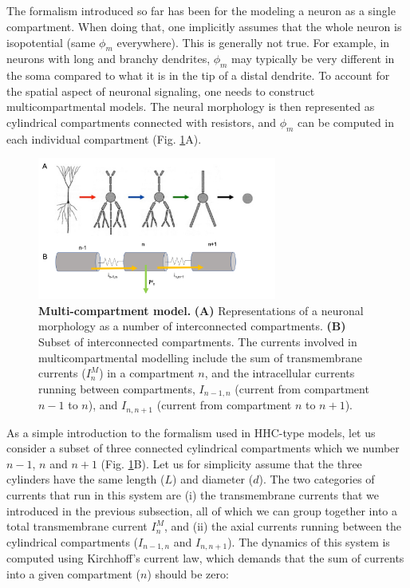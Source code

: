 \subsection{}
\label{sec:Neuron:morphology}
The formalism introduced so far has been for the modeling a neuron as a single compartment. When doing that, one implicitly assumes that the whole neuron is isopotential (same $\phi_m$ everywhere). This is generally not true. For example, in neurons with long and branchy dendrites, $\phi_m$ may typically be very different in the soma compared to what it is in the tip of a distal dendrite. To account for the spatial aspect of neuronal signaling, one needs to construct multicompartmental models. The neural morphology is then represented as cylindrical compartments connected with resistors, and $\phi_m$ can be computed in each individual compartment  (Fig. \ref{Neuron:fig:multikompisen}A). 

\begin{figure}[!ht]
\begin{center}
\includegraphics[width=0.7\textwidth]{Figures/Neuron/Multikompis.png}
\end{center}
\caption{\textbf{Multi-compartment model.} {\bf (A)} Representations of a neuronal morphology as a number of interconnected compartments. {\bf (B)} Subset of interconnected compartments. The currents involved in multicompartmental modelling include the sum of transmembrane currents ($I^M_n$) in a compartment $n$, and the intracellular currents running between 
compartments, $I_{n-1,n}$ (current from compartment $n-1$ to $n$), and $I_{n,n+1}$ (current from compartment $n$ to $n+1$).}
\label{Neuron:fig:multikompisen}
\end{figure}

As a simple introduction to the formalism used in HHC-type models, let us consider a subset of three connected cylindrical compartments which we number $n-1$, $n$ and $n+1$ (Fig. \ref{Neuron:fig:multikompisen}B). Let us for simplicity assume that the three cylinders have the same length ($L$) and diameter ($d$). The two categories of currents that run in this system are (i) the transmembrane currents that we introduced in the previous subsection, all of which we can group together into a total transmembrane current $I^M_n$, and (ii) the axial currents running between the cylindrical compartments ($I_{n-1,n}$ and $I_{n,n+1}$). The dynamics of this system is computed using Kirchhoff's current law, which demands that the sum of currents into a given compartment ($n$) should be zero:

